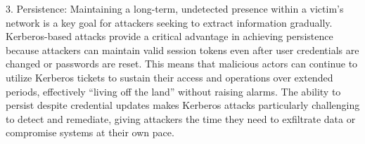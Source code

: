 3. Persistence:
Maintaining a long-term, undetected presence within a victim’s network is a key goal for attackers seeking to extract information gradually. Kerberos-based attacks provide a critical advantage in achieving persistence because attackers can maintain valid session tokens even after user credentials are changed or passwords are reset. This means that malicious actors can continue to utilize Kerberos tickets to sustain their access and operations over extended periods, effectively “living off the land” without raising alarms. The ability to persist despite credential updates makes Kerberos attacks particularly challenging to detect and remediate, giving attackers the time they need to exfiltrate data or compromise systems at their own pace.

 

 


















